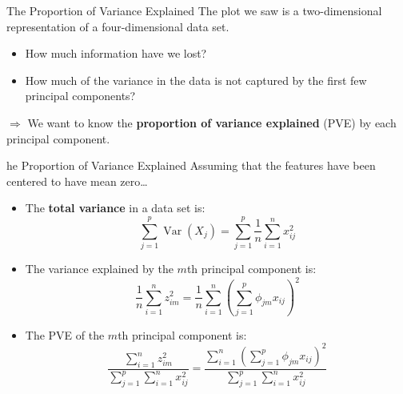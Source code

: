 \documentclass[
  ignorenonframetext,
  aspectratio=169,
]{beamer}
\begin{document}
\begin{frame}{The Proportion of Variance Explained}
\protect\hypertarget{the-proportion-of-variance-explained}{}
The plot we saw is a two-dimensional representation of a
four-dimensional data set.

\begin{itemize}
\item
  How much information have we lost?
\item
  How much of the variance in the data is not captured by the first few
  principal components?
\end{itemize}

\quad \(\Rightarrow\) We want to know the \textbf{proportion of variance
explained} (PVE) by each principal component.
\end{frame}

\begin{frame}{he Proportion of Variance Explained}
\protect\hypertarget{he-proportion-of-variance-explained}{}
Assuming that the features have been centered to have mean zero\ldots{}

\begin{itemize}
\item
  The \textbf{total variance} in a data set is:
  \[\sum_{j=1}^{p} \operatorname{Var}\left(X_{j}\right)=\sum_{j=1}^{p} \frac{1}{n} \sum_{i=1}^{n} x_{i j}^{2}\]
\item
  The variance explained by the \(m\)th principal component is:
  \[\frac{1}{n} \sum_{i=1}^{n} z_{i m}^{2}=\frac{1}{n} \sum_{i=1}^{n}\left(\sum_{j=1}^{p} \phi_{j m} x_{i j}\right)^{2}\]
\item
  The PVE of the \(m\)th principal component is:
  \[\frac{\sum_{i=1}^{n} z_{i m}^{2}}{\sum_{j=1}^{p} \sum_{i=1}^{n} x_{i j}^{2}}=\frac{\sum_{i=1}^{n}\left(\sum_{j=1}^{p} \phi_{j m} x_{i j}\right)^{2}}{\sum_{j=1}^{p} \sum_{i=1}^{n} x_{i j}^{2}}\]
\end{itemize}
\end{frame}
\end{document}
